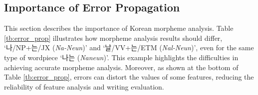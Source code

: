 \subsection{Importance of Error Propagation}
This section describes the importance of Korean morpheme analysis.
Table \ref{tb:error_prop} illustrates how morpheme analysis results should differ, `나\tiny{/NP}\normalsize{+는}\tiny{/JX}\normalsize{ (\textit{Na-Neun})' and `날}\tiny{/VV}\normalsize{+는}\tiny{/ETM}\normalsize{ (\textit{Nal-Neun})'}, even for the same type of wordpiece `나는 (\textit{Naneun})'. 
This example highlights the difficulties in achieving accurate morpheme analysis. 
Moreover, as shown at the bottom of Table \ref{tb:error_prop}, errors can distort the values of some features, reducing the reliability of feature analysis and writing evaluation. 



